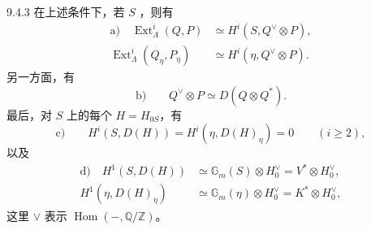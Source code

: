 \begin{SGAresult}{}{9.4.3}
在上述条件下，若 $S$ ，则有
\begin{align*}
 \text{a)}\quad
 \operatorname{Ext}^i_\Lambda(Q,P)&\simeq H^i(S,Q^\vee\otimes P),\\
 \operatorname{Ext}^i_\Lambda(Q_\eta,P_\eta)&\simeq H^i(\eta,Q^\vee\otimes P).
\end{align*}
另一方面，有
\[
 \text{b)}\qquad Q^\vee\otimes P\simeq D(Q\otimes Q^*).
\]
最后，对 $S$ 上的每个 $H=H_{0S}$，有
\[
 \text{c)}\qquad H^i(S,D(H))=H^i(\eta,D(H)_\eta)=0\qquad(i\geq2),
\]
以及
\begin{align*}
 \text{d)}\quad H^1(S,D(H))&\simeq\mathbb G_m(S)\otimes H_0^\vee
   =V^*\otimes H_0^\vee,\\
 H^1(\eta,D(H)_\eta)&\simeq\mathbb G_m(\eta)\otimes H_0^\vee
   =K^*\otimes H_0^\vee,
\end{align*}
这里 $\vee$ 表示 $\operatorname{Hom}(-,\mathbb Q/\mathbb Z)$。
\end{SGAresult}
